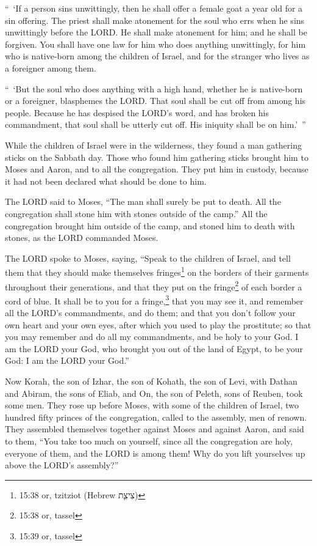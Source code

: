 \myverse{}“ ‘If a person sins unwittingly, then he shall offer a female
goat a year old for a sin offering.
\myverse{}The priest shall make atonement for the soul who errs when he sins unwittingly
before the LORD. He shall make atonement for him; and he shall be forgiven.
\myverse{}You shall have one law for him who does anything unwittingly, for him who
is native-born among the children of Israel, and for the stranger who lives as a foreigner among them.


\myverse{}“ ‘But the soul who does anything with a high hand, whether he
is native-born or a foreigner, blasphemes the LORD. That soul shall be cut off from among his people.
\myverse{}Because he has despised the LORD’s word, and has broken his commandment,
that soul shall be utterly cut off. His iniquity shall be on him.’ ”


\myverse{}While the children of Israel were in the wilderness, they found
a man gathering sticks on the Sabbath day.
\myverse{}Those who found him gathering sticks brought him to Moses and Aaron, and
to all the congregation.
\myverse{}They put him in custody, because it had not been declared what should be
done to him.


\myverse{}The LORD said to Moses, “The man shall surely be put to death.
All the congregation shall stone him with stones outside of the camp.”
\myverse{}All the congregation brought him outside of the camp, and stoned him to death
with stones, as the LORD commanded Moses.


\myverse{}The LORD spoke to Moses, saying,
\myverse{}“Speak to the children of Israel, and tell them that they should make themselves
fringes\footnote{ 15:38 or, tzitziot (Hebrew צִיצִ֛ת)} on the borders of their garments throughout their generations,
and that they put on the fringe\footnote{ 15:38 or, tassel} of each border a cord of blue.
\myverse{}It shall be to you for a fringe,\footnote{ 15:39 or, tassel} that you may see it, and remember all the LORD’s commandments, and do them;
and that you don’t follow your own heart and your own eyes, after which you used to play the prostitute;
\myverse{}so that you may remember and do all my commandments, and be holy to your
God.
\myverse{}I am the LORD your God, who brought you out of the land of Egypt, to be your
God: I am the LORD your God.”


\mychapter{} \myverse*{}Now Korah, the son of Izhar, the son of Kohath, the son of Levi,
with Dathan and Abiram, the sons of Eliab, and On, the son of Peleth, sons of Reuben, took some men.
\myverse{}They rose up before Moses, with some of the children of Israel, two hundred
fifty princes of the congregation, called to the assembly, men of renown.
\myverse{}They assembled themselves together against Moses and against Aaron, and said
to them, “You take too much on yourself, since all the congregation are holy, everyone of them, and the
LORD is among them! Why do you lift yourselves up above the LORD’s assembly?”


